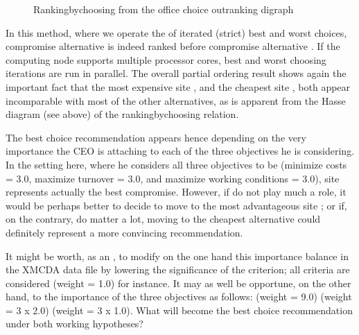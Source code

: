 \documentclass[a4paper,12pt,english]{sphinxhowto}
\let\sphinxpxdimen\pdfpxdimen\else\newdimen\sphinxpxdimen
\begin{document}
\begin{figure}[H]
\centering
\capstart

\noindent\sphinxincludegraphics[width=200\sphinxpxdimen]{{officeChoiceRanking}.png}
\caption{Ranking\sphinxhyphen{}by\sphinxhyphen{}choosing from the office choice outranking digraph}\label{\detokenize{tutorial:id124}}\end{figure}

In this  method, where we operate the  of iterated (strict) best and worst choices, compromise alternative  is indeed ranked before compromise alternative . If the computing node supports multiple processor cores, best and worst choosing iterations are run in parallel. The overall partial ordering result shows again the important fact that the most expensive site , and the cheapest site , both appear incomparable with most of the other alternatives, as is apparent from the Hasse diagram (see above) of the ranking\sphinxhyphen{}by\sphinxhyphen{}choosing relation.

The best choice recommendation appears hence depending on the very
importance the CEO is attaching to each of the three objectives he is
considering. In the setting here, where he considers all three
objectives to be  (minimize costs = 3.0, maximize
turnover = 3.0, and maximize working conditions = 3.0), site 
represents actually the best compromise. However, if  do not
play much a role, it would be perhaps better to decide to move to the most advantageous site ; or if, on the contrary,  do matter a lot, moving to the cheapest alternative  could definitely represent a more convincing recommendation.

It might be worth, as an , to modify on the one hand this importance balance in the XMCDA data file by lowering the significance of the  criterion; all criteria are considered  (weight = 1.0) for instance. It may as well be opportune, on the other hand, to  the importance of the three objectives as follows:   (weight = 9.0) \sphinxstylestrong{\textgreater{}}  (weight = 3 x 2.0) \sphinxstylestrong{\textgreater{}}  (weight = 3 x 1.0). What will become the best choice recommendation under both working hypotheses?
\end{document}
